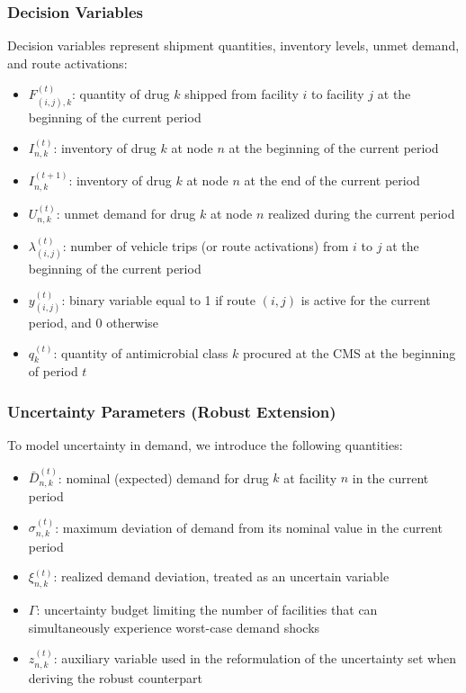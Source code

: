 \documentclass{article}
\begin{document}
\subsubsection{Decision Variables}
\label{4.2.3}

Decision variables represent shipment quantities, inventory levels, unmet demand, and route activations:

\begin{itemize}
  \item $F_{(i,j),k}^{(t)}$: quantity of drug \(k\) shipped from facility \(i\) to facility \(j\) at the beginning of the current period
  \item $I^{(t)}_{n,k}$: inventory of drug \(k\) at node \(n\) at the beginning of the current period
  \item $I^{(t+1)}_{n,k}$: inventory of drug \(k\) at node \(n\) at the end of the current period
  \item $U_{n,k}^{(t)}$: unmet demand for drug \(k\) at node \(n\) realized during the current period
  \item $\lambda_{(i,j)}^{(t)}$: number of vehicle trips (or route activations) from \(i\) to \(j\) at the beginning of the current period
  \item $y_{(i,j)}^{(t)}$: binary variable equal to 1 if route \((i,j)\) is active for the current period, and 0 otherwise
  \item $q_k^{(t)}$: quantity of antimicrobial class $k$ procured at the CMS at the beginning of period $t$
\end{itemize}

\subsubsection{Uncertainty Parameters (Robust Extension)}
\label{4.2.4}

To model uncertainty in demand, we introduce the following quantities:

\begin{itemize}
  \item $\bar{D}_{n,k}^{(t)}$: nominal (expected) demand for drug \(k\) at facility \(n\) in the current period
  \item $\sigma_{n,k}^{(t)}$: maximum deviation of demand from its nominal value in the current period
  \item $\xi_{n,k}^{(t)}$: realized demand deviation, treated as an uncertain variable
  \item $\Gamma$: uncertainty budget limiting the number of facilities that can simultaneously experience worst-case demand shocks
  \item $z_{n,k}^{(t)}$: auxiliary variable used in the reformulation of the uncertainty set when deriving the robust counterpart
\end{itemize}
\end{document}
